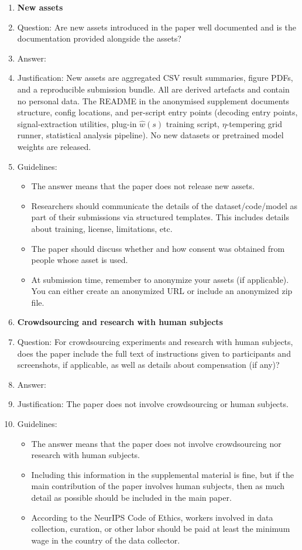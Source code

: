 \begin{enumerate}
\item \textbf{New assets}
    \item[] Question: Are new assets introduced in the paper well documented and is the documentation provided alongside the assets?
    \item[] Answer: \answerYes{}
    \item[] Justification: New assets are aggregated CSV result summaries, figure PDFs, and a reproducible submission bundle. All are derived artefacts and contain no personal data. The README in the anonymised supplement documents structure, config locations, and per-script entry points (decoding entry points, signal-extraction utilities, plug-in $\hat w(s)$ training script, $\eta$-tempering grid runner, statistical analysis pipeline). No new datasets or pretrained model weights are released.
    \item[] Guidelines:
    \begin{itemize}
        \item The answer \answerNA{} means that the paper does not release new assets.
        \item Researchers should communicate the details of the dataset\slash code\slash model as part of their submissions via structured templates. This includes details about training, license, limitations, etc.
        \item The paper should discuss whether and how consent was obtained from people whose asset is used.
        \item At submission time, remember to anonymize your assets (if applicable). You can either create an anonymized URL or include an anonymized zip file.
    \end{itemize}

\item \textbf{Crowdsourcing and research with human subjects}
    \item[] Question: For crowdsourcing experiments and research with human subjects, does the paper include the full text of instructions given to participants and screenshots, if applicable, as well as details about compensation (if any)?
    \item[] Answer: \answerNA{}
    \item[] Justification: The paper does not involve crowdsourcing or human subjects.
    \item[] Guidelines:
    \begin{itemize}
        \item The answer \answerNA{} means that the paper does not involve crowdsourcing nor research with human subjects.
        \item Including this information in the supplemental material is fine, but if the main contribution of the paper involves human subjects, then as much detail as possible should be included in the main paper.
        \item According to the NeurIPS Code of Ethics, workers involved in data collection, curation, or other labor should be paid at least the minimum wage in the country of the data collector.
    \end{itemize}


\end{enumerate}
